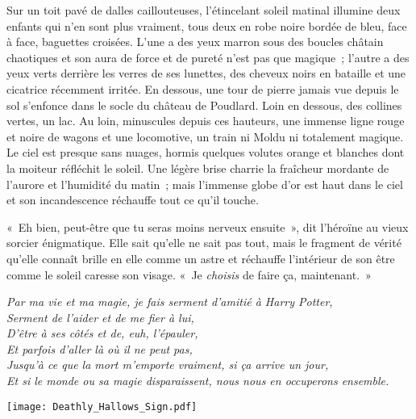 Sur un toit pavé de dalles caillouteuses, l'étincelant soleil matinal illumine deux enfants qui n'en sont plus vraiment, tous deux en robe noire bordée de bleu, face à face, baguettes croisées. L'une a des yeux marron sous des boucles châtain chaotiques et son aura de force et de pureté n'est pas que magique~; l'autre a des yeux verts derrière les verres de ses lunettes, des cheveux noirs en bataille et une cicatrice récemment irritée. En dessous, une tour de pierre jamais vue depuis le sol s'enfonce dans le socle du château de Poudlard. Loin en dessous, des collines vertes, un lac. Au loin, minuscules depuis ces hauteurs, une immense ligne rouge et noire de wagons et une locomotive, un train ni Moldu ni totalement magique. Le ciel est presque sans nuages, hormis quelques volutes orange et blanches dont la moiteur réfléchit le soleil. Une légère brise charrie la fraîcheur mordante de l'aurore et l'humidité du matin~; mais l'immense globe d'or est haut dans le ciel et son incandescence réchauffe tout ce qu'il touche.

«~Eh bien, peut-être que tu seras moins nerveux ensuite~», dit l'héroïne au vieux sorcier énigmatique. Elle sait qu'elle ne sait pas tout, mais le fragment de vérité qu'elle connaît brille en elle comme un astre et réchauffe l'intérieur de son être comme le soleil caresse son visage. «~Je \emph{choisis} de faire ça, maintenant.~»

\emph{Par ma vie et ma magie, je fais serment d'amitié à Harry Potter,\\ Serment de l'aider et de me fier à lui,\\ D'être à ses côtés et de, euh, l'épauler,\\ Et parfois d'aller là où il ne peut pas,\\ Jusqu'à ce que la mort m'emporte vraiment, si ça arrive un jour,\\ Et si le monde ou sa magie disparaissent, nous nous en occuperons ensemble.}
\vspace*{\fill}
{
\begin{center}
\texttt{[image: Deathly\_Hallows\_Sign.pdf]}
\end{center}
}
\vspace*{\fill}
\clearpage


